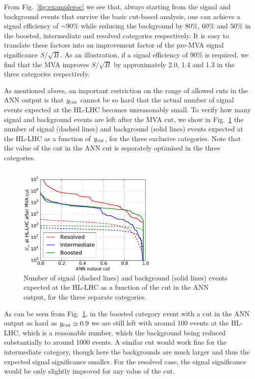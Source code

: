 From Fig.~\ref{fig:exampleroc} we see that, always starting from the signal
and background events that survive the basic cut-based analysis,
one can achieve a  signal
efficiency of $\sim 90\%$ while reducing the background by
$80\%$, $60\%$ and $50\%$ in the boosted, intermediate and resolved
categories respectively.
%
It is easy to translate these factors into an  improvement factor of the pre-MVA
signal significance $S/\sqrt{B}$.
%
As an illustration, if a signal efficiency of 90\%
is required, we find that the MVA improves $S/\sqrt{B}$
by  approximately 2.0, 1.4 and 1.3  in the three categories respectively.

As mentioned above, an
 important restriction on the range of allowed cuts in the ANN output
 is that $y_{\rm cut}$
 cannot be so hard that the actual number of signal events expected
at the HL-LHC becomes unreasonably small.
%
To verify how many signal and background events are left after the MVA cut,
we show in Fig.~\ref{fig:nev2} the number of signal (dashed lines) and background (solid lines)
  events expected at the HL-LHC as a function of $y_{\rm cut}$,
  for the three exclusive categories.
  Note that the value of the cut in the ANN cut is separately optimised in the three
  categories.

\begin{figure}[t]
\begin{center}
\includegraphics[width=0.65\textwidth]{plots/nev2_noPU.pdf}
\caption{\small Number of signal (dashed lines) and background (solid lines)
  events expected at the HL-LHC as a function of the cut in the ANN output,
  for the three separate categories.
}
\label{fig:nev2}
\end{center}
\end{figure}

As can be seen from Fig.~\ref{fig:nev2}, in the boosted category
event with a cut in the ANN output as hard as $y_{\rm cut}\simeq 0.9$
we are still left
with around 100 events at the HL-LHC, which is a reasonable number,
which the background being reduced substantially to around
1000 events.
%
A similar cut would work fine for the intermediate category, though here
the backgrounds are much larger and thus the expected signal significance smaller.
%
For the resolved case, the signal significance would be only slightly
improved for any value of the cut.

